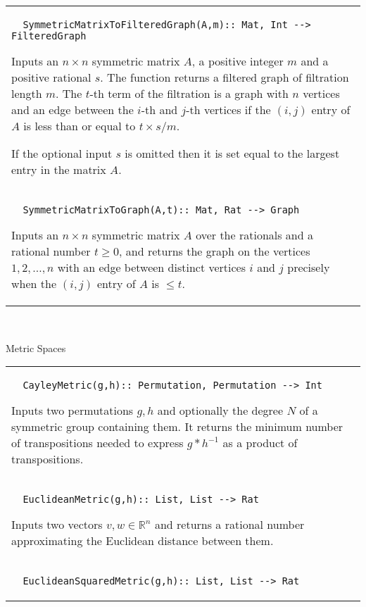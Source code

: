 \documentclass[a4paper,11pt]{report}
\begin{document}
{\begin{center}
\begin{tabular}{|l|}
\begin{verbatim}  SymmetricMatrixToFilteredGraph(A,m):: Mat, Int --> FilteredGraph
\end{verbatim}


 

Inputs an $n \times n$ symmetric matrix $A$, a positive integer $m$ and a positive rational $s$. The function returns a filtered graph of filtration length $m$. The $t$-th term of the filtration is a graph with $n$ vertices and an edge between the $i$-th and $j$-th vertices if the $(i,j)$ entry of $A$ is less than or equal to $t \times s/m$. 

 If the optional input $s$ is omitted then it is set equal to the largest entry in the matrix $A$. \\
 \index{SymmetricMatrixToGraph} 
\begin{verbatim}  SymmetricMatrixToGraph(A,t):: Mat, Rat --> Graph
\end{verbatim}


 

 Inputs an $n\times n$ symmetric matrix $A$ over the rationals and a rational number $t \ge 0$, and returns the graph on the vertices $1,2, \ldots, n$ with an edge between distinct vertices $i$ and $j$ precisely when the $(i,j)$ entry of $A$ is $\le t$. \\
\end{tabular}\\[2mm]
\end{center}

 Metric Spaces \begin{center}
\begin{tabular}{|l|} \index{CayleyMetric} 
\begin{verbatim}  CayleyMetric(g,h):: Permutation, Permutation --> Int
\end{verbatim}


 

 Inputs two permutations $g,h$ and optionally the degree $N$ of a symmetric group containing them. It returns the minimum number of
transpositions needed to express $g*h^{-1}$ as a product of transpositions. \\
 \index{EuclideanMetric} 
\begin{verbatim}  EuclideanMetric(g,h):: List, List --> Rat
\end{verbatim}


 

 Inputs two vectors $v,w \in \mathbb R^n$ and returns a rational number approximating the Euclidean distance between
them. \\
 \index{EuclideanSquaredMetric} 
\begin{verbatim}  EuclideanSquaredMetric(g,h):: List, List --> Rat
\end{verbatim}



\end{tabular}
\end{center}}
\end{document}
